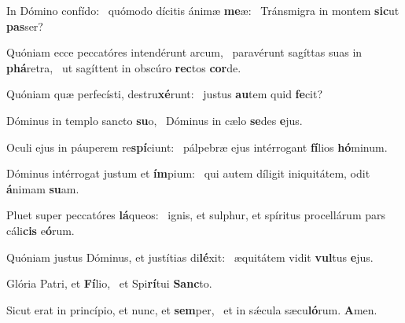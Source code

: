 \item In Dómino confído:~\pscross{} quómodo dícitis ánimæ \textbf{me}æ:~\psstar{} Tránsmigra in montem \textbf{sic}ut \textbf{pas}ser?
\item Quóniam ecce peccatóres intendérunt arcum,~\pscross{} paravérunt sagíttas suas in \textbf{phá}retra,~\psstar{} ut sagíttent in obscúro \textbf{rec}tos \textbf{cor}de.
\item Quóniam quæ perfecísti, destru\textbf{xé}runt:~\psstar{} justus \textbf{au}tem quid \textbf{fe}cit?
\item Dóminus in templo sancto \textbf{su}o,~\psstar{} Dóminus in cælo \textbf{se}des \textbf{e}jus.
\item Oculi ejus in páuperem re\textbf{spí}ciunt:~\psstar{} pálpebræ ejus intérrogant \textbf{fí}lios \textbf{hó}minum.
\item Dóminus intérrogat justum et \textbf{ím}pium:~\psstar{} qui autem díligit iniquitátem, odit \textbf{á}nimam \textbf{su}am.
\item Pluet super peccatóres \textbf{lá}queos:~\psstar{} ignis, et sulphur, et spíritus procellárum pars cáli\textbf{cis} e\textbf{ó}rum.
\item Quóniam justus Dóminus, et justítias di\textbf{lé}xit:~\psstar{} æquitátem vidit \textbf{vul}tus \textbf{e}jus.
\item Glória Patri, et \textbf{Fí}lio,~\psstar{} et Spi\textbf{rí}tui \textbf{Sanc}to.
\item Sicut erat in princípio, et nunc, et \textbf{sem}per,~\psstar{} et in sǽcula sæcu\textbf{ló}rum. \textbf{A}men.

